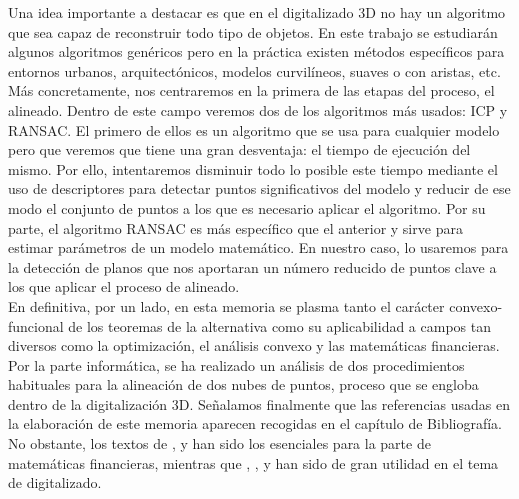 Una idea importante a destacar es que en el digitalizado 3D no hay un algoritmo que sea capaz de reconstruir todo tipo de objetos. En este trabajo se estudiarán algunos algoritmos genéricos pero en la práctica existen métodos específicos para entornos urbanos, arquitectónicos, modelos curvilíneos, suaves o con aristas, etc. Más concretamente, nos centraremos en la primera de las etapas del proceso, el alineado. Dentro de este campo veremos dos de los algoritmos más usados: ICP y RANSAC. El primero de ellos es un algoritmo que se usa para cualquier modelo pero que veremos que tiene una gran desventaja: el tiempo de ejecución del mismo. Por ello, intentaremos disminuir todo lo posible este tiempo mediante el uso de descriptores para detectar puntos significativos del modelo y reducir de ese modo el conjunto de puntos a los que es necesario aplicar el algoritmo. Por su parte, el algoritmo RANSAC es más específico que el anterior y sirve para estimar parámetros de un modelo matemático. En nuestro caso, lo usaremos para la detección de planos que nos aportaran un número reducido de puntos clave a los que aplicar el proceso de alineado. \\

En definitiva, por un lado, en esta memoria se plasma tanto el carácter convexo-funcional de los teoremas de la alternativa como su aplicabilidad a campos tan diversos como la optimización, el análisis convexo y las matemáticas financieras. Por la parte informática, se ha realizado un análisis de dos procedimientos habituales para la alineación de dos nubes de puntos, proceso que se engloba dentro de la digitalización 3D. Señalamos finalmente que las referencias usadas en la elaboración de este memoria aparecen recogidas en el capítulo de Bibliografía. No obstante, los textos de \cite{borwein}, \cite{elliot1999mathematics} y \cite{Simons2008} han sido los esenciales para la parte de matemáticas financieras, mientras que \cite{QuatYan}, \cite{ICPBesl}, \cite{fischler1981random} y \cite{QT+Opengl} han sido de gran utilidad en el tema de digitalizado.